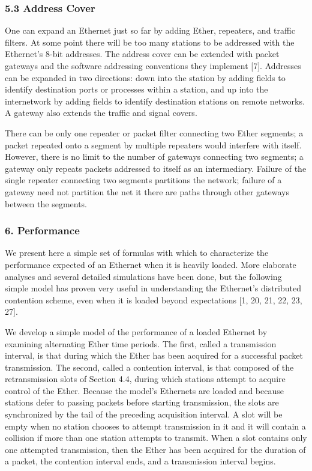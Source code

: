 \subsubsection{5.3 Address Cover}

One can expand an Ethernet just so far by adding Ether, repeaters, and traffic filters. At some point there will be too many stations to be addressed with the Ethernet's 8-bit addresses. The address cover can be extended with packet gateways and the software addressing conventions they implement [7]. Addresses can be expanded in two directions: down into the station by adding fields to identify destination ports or processes within a station, and up into the internetwork by adding fields to
identify destination stations on remote networks. A gateway also extends the traffic and signal covers.

There can be only one repeater or packet filter connecting two Ether segments; a packet repeated onto a segment by multiple repeaters would interfere with itself. However, there is no limit to the number of gateways connecting two segments; a gateway only repeats packets addressed to itself as an intermediary. Failure of the single repeater connecting two segments partitions the network; failure of a gateway need not partition the net it there are paths through other gateways between the segments.

\subsubsection*{6. Performance}
We present here a simple set of formulas with which to characterize the performance expected of an Ethernet when it is heavily loaded. More elaborate analyses and several detailed simulations have been done, but the following simple model has proven very useful in understanding the Ethernet's distributed contention scheme, even when it is loaded beyond expectations [1, 20, 21, 22, 23, 27].


We develop a simple model of the performance of a loaded Ethernet by examining alternating Ether time periods. The first, called a transmission interval, is that  during which the Ether has been acquired for a successful packet transmission. The second, called a contention interval, is that composed of the retransmission slots of Section 4.4, during which stations attempt to acquire control of the Ether. Because the model's Ethernets are loaded and because stations defer to passing packets before starting transmission, the slots are synchronized by the tail of the preceding acquisition interval. A slot will be empty when no station chooses to attempt transmission in it and it will contain a collision if more than one station attempts to transmit. When a slot contains only one attempted transmission, then the Ether has been acquired for the duration of a packet, the contention interval ends, and a transmission interval begins.

